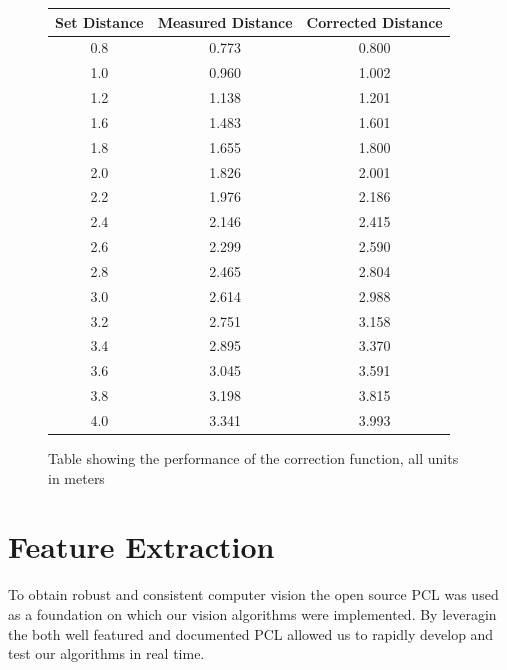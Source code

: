 \documentclass[]{article}
\begin{document}
{\begin{figure}[htb]
	\begin{center}
	\begin{tabular}{ccc}
		\hline

		\hline
		\textbf{Set Distance}& \textbf{Measured Distance}& \textbf{Corrected Distance} \\
		\hline
		0.8		& 0.773	& 0.800\\
		1.0		& 0.960	& 1.002\\
		1.2 	& 1.138	& 1.201\\
		1.6 	& 1.483	& 1.601\\
		1.8 	& 1.655	& 1.800\\
		2.0 	& 1.826	& 2.001\\
		2.2 	& 1.976	& 2.186\\
		2.4 	& 2.146	& 2.415\\
		2.6 	& 2.299	& 2.590\\
		2.8 	& 2.465	& 2.804\\
		3.0 	& 2.614	& 2.988\\
		3.2 	& 2.751	& 3.158\\
		3.4 	& 2.895	& 3.370\\
		3.6 	& 3.045	& 3.591\\
		3.8 	& 3.198	& 3.815\\
		4.0 	& 3.341	& 3.993\\
		\hline

		\hline
	\end{tabular}
	\end{center}
	\caption{Table showing the performance of the correction function, all units in meters}
	\label{tab:averages}
\end{figure}


\clearpage

\section{Feature Extraction} %
\label{sec:feature_extraction}

To obtain robust and consistent computer vision the open source \ac{PCL} was used as a foundation on which our vision algorithms were implemented. By leveragin the both well featured and documented  \ac{PCL} allowed us to rapidly develop and test our algorithms in real time. 

}
\end{document}
